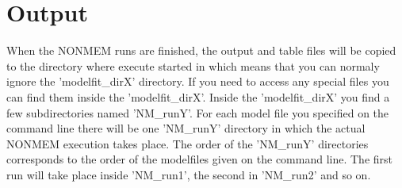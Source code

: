 \documentclass[a4paper,12pt]{article}
\begin{document}
\section{Output}

When the NONMEM runs are finished, the output and table files will be copied to the directory where execute started in which means that you can normaly ignore the 'modelfit\_dirX' directory. If you need to access any special files you can find them inside the 'modelfit\_dirX'. Inside the 'modelfit\_dirX' you find a few subdirectories named 'NM\_runY'. For each model file you specified on the command line there will be one 'NM\_runY' directory in which the actual NONMEM execution takes place. The order of the 'NM\_runY' directories corresponds to the order of the modelfiles given on the command line. The first run will take place inside 'NM\_run1', the second in 'NM\_run2' and so on.
\end{document}
